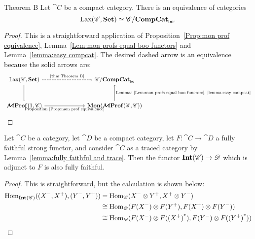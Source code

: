 \documentclass[12pt,oneside,article,draft]{memoir}
\begin{document}
\begin{named}{Theorem B}\label{thm:Theorem B}
   Let $\cat{C}$ be a compact category.
   There is an equivalence of categories
   \[
      \operatorname{Lax}(\mathscr{C},\mathbf{Set})\simeq\mathscr{C}/\mathbf{CompCat}_{\mathsf{bo}}.
   \]
\end{named}
\begin{proof}
   This is a straightforward application of Proposition~\ref{Prop:mon prof equivalence}, Lemma~\ref{Lem:mon profs equal boo functors} and Lemma~\ref{lemma:easy compcat}.
   The desired dashed arrow is an equivalence because the solid arrows are:
   $$
   \begin{tikzcd}[column sep=2.5cm,row sep=1cm]
      \Lax(\cat{C},\Set)\ar[d,equal]\ar[r,dashed,"\tn{\ref{thm:Theorem B}}"]
         &\cat{C}/\CompCat_{\bo} \\
      \MProf(1,\cat{C})\ar[r,"\tn{Proposition~\ref{Prop:mon prof equivalence}}"']
         &\Mon(\MProf(\cat{C},\cat{C}))\ar[u,"\tn{Lemmas~\ref{Lem:mon profs equal boo functors},~\ref{lemma:easy compcat}}"']
   \end{tikzcd}
   $$
\end{proof}

\begin{lemma}\label{lemma:more fully faithfulness}
   Let $\cat{C}$ be a category, let $\cat{D}$ be a compact category, let $F\colon\cat{C}\to\cat{D}$ a fully faithful strong functor, and consider $\cat{C}$ as a traced category by Lemma~\ref{lemma:fully faithful and trace}.
   Then the functor $\mathbf{Int}(\mathscr{C})\to\mathscr{D}$ which is adjunct to $F$ is also fully faithful.
\end{lemma}
\begin{proof}
   This is straightforward, but the calculation is shown below:
   \begin{align*}
      \operatorname{Hom}_{\mathbf{Int}(\mathscr{C})}((X^-,X^+),(Y^-,Y^+))&=\operatorname{Hom}_{\mathscr{C}}(X^-\otimes Y^+,X^+\otimes Y^-) \\
      &\cong\operatorname{Hom}_{\mathscr{D}}(F(X^-)\otimes F(Y^+),F(X^+)\otimes F(Y^-)) \\
      &\cong\operatorname{Hom}_{\mathscr{D}}(F(X^-)\otimes F({(X^+)}^*),F(Y^-)\otimes F({(Y^+)}^*))
   \end{align*}
\end{proof}
\end{document}
